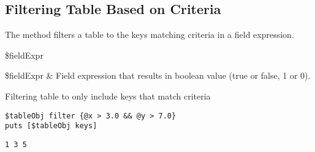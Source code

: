 \documentclass{article}
\begin{document}
\subsection{Filtering Table Based on Criteria}
The method  filters a table to the keys matching criteria in a field expression. 
\begin{syntax}
 \$fieldExpr
\end{syntax}
\begin{args}
\$fieldExpr & Field expression that results in boolean value (true or false, 1 or 0).
\end{args}
\begin{example}{Filtering table to only include keys that match criteria}
\begin{lstlisting}
$tableObj filter {@x > 3.0 && @y > 7.0}
puts [$tableObj keys]
\end{lstlisting}
\tcblower
\begin{lstlisting}
1 3 5
\end{lstlisting}
\end{example}

\clearpage
\end{document}
